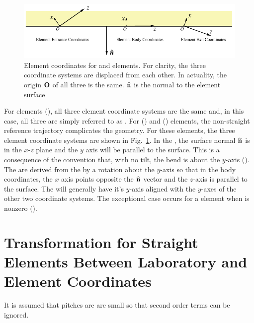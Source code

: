 \begin{figure}[tb]
  \centering
  \includegraphics[width=5in]{photon-ele-coords.pdf}
  \caption[Crystal and Mirror Element Coordinates.]
{Element coordinates for  and  elements. For
clarity, the three coordinate systems are displaced from each
other. In actuality, the origin ${\bf O}$ of all three is the same.
${\widehat{\bf n}}$ is the normal to the element surface}
  \label{f:photon.ele.coords}
\end{figure}

For  elements (), all three element
coordinate systems are the same and, in this case, all three are
simply referred to as .  For 
() and  () elements, the
non-straight reference trajectory complicates the geometry. For these
elements, the three element coordinate systems are shown in
Fig.~\ref{f:photon.ele.coords}. In the , the surface normal ${\widehat{\bf n}}$ is in the $x$-$z$ plane
and the $y$ axis will be parallel to the surface. This is a
consequence of the convention that, with no tilt, the bend is about
the $y$-axis (). The  are
derived from the  by a rotation about
the $y$-axis so that in the body coordinates, the $x$ axis points
opposite the ${\widehat{\bf n}}$ vector and the $z$-axis is parallel to the
surface. The  will generally have it's
$y$-axis aligned with the $y$-axes of the other two coordinate
systems. The exceptional case occurs for a  element when
 is nonzero ().

\section{Transformation for Straight Elements Between 
Laboratory and Element Coordinates}
\label{s:straight-lab-ele}

It is assumed that pitches are are small so that second
order terms can be ignored.

